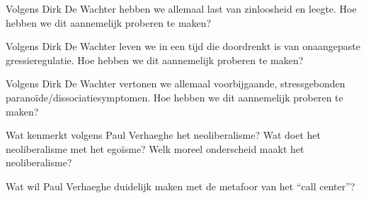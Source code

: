 \documentclass[main.tex]{subfiles}
\begin{document}
\begin{examenvraag}
    \begin{vraag}
        Volgens Dirk De Wachter hebben we allemaal last van zinloosheid en leegte. Hoe hebben we dit aannemelijk proberen te maken?
    \end{vraag}

    \begin{antwoord}
    \end{antwoord}
\end{examenvraag}


\begin{examenvraag}
    \begin{vraag}
        Volgens Dirk De Wachter leven we in een tijd die doordrenkt is van onaangepaste gressieregulatie. Hoe hebben we dit aannemelijk proberen te maken?
    \end{vraag}

    \begin{antwoord}
    \end{antwoord}
\end{examenvraag}


\begin{examenvraag}
    \begin{vraag}
        Volgens Dirk De Wachter vertonen we allemaal voorbijgaande, stressgebonden paranoïde/dissociatiesymptomen. Hoe hebben we dit aannemelijk proberen te maken?
    \end{vraag}

    \begin{antwoord}
    \end{antwoord}
\end{examenvraag}


\begin{examenvraag}
    \begin{vraag}
        Wat kenmerkt volgens Paul Verhaeghe het neoliberalisme? Wat doet het neoliberalisme met het egoïsme? Welk moreel onderscheid maakt het neoliberalisme?
    \end{vraag}

    \begin{antwoord}
    \end{antwoord}
\end{examenvraag}


\begin{examenvraag}
    \begin{vraag}
        Wat wil Paul Verhaeghe duidelijk maken met de metafoor van het “call center”?
    \end{vraag}

    \begin{antwoord}
    \end{antwoord}
\end{examenvraag}
\end{document}
